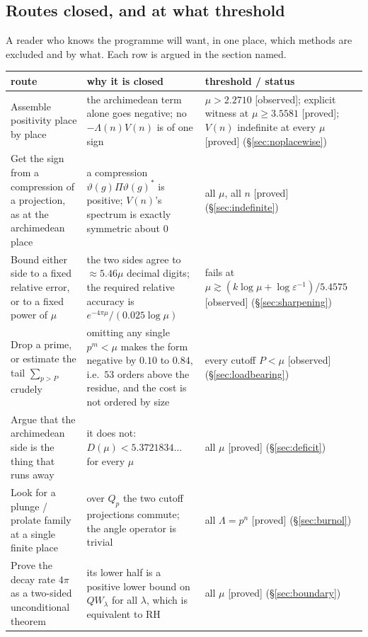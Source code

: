 \documentclass[11pt,a4paper]{article}
\theoremstyle{plain}
\theoremstyle{definition}
\theoremstyle{remark}
\newcommand{\st}[1]{{\normalfont\sffamily\footnotesize[#1]}}
\newcommand{\proved}{\st{proved}}
\newcommand{\observed}{\st{observed}}
\newcommand{\R}{\mathbb{R}}
\newcommand{\Z}{\mathbb{Z}}
\newcommand{\Q}{\mathbb{Q}}
\newcommand{\A}{\mathbb{A}}
\newcommand{\E}{\mathcal{E}}
\newcommand{\F}{\mathcal{F}}
\newcommand{\QW}{QW}
\def\QW{QW}\def\E{E}\def\F{F}\def\R{R}\def\Q{Q}\def\Z{Z}\def\A{A}%
\begin{document}
\subsection{Routes closed, and at what threshold}
\label{sec:closed}

A reader who knows the programme will want, in one place, which methods are
excluded and by what.  Each row is argued in the section named.

\begin{center}\small
\begin{tabular}{@{}p{}p{}p{}@{}}
\hline
route & why it is closed & threshold / status \\
\hline
Assemble positivity place by place
& the archimedean term alone goes negative; no $-\Lambda(n)V(n)$ is of one sign
& $\mu>2.2710$ \observed; explicit witness at $\mu\ge3.5581$ \proved{};
  $V(n)$ indefinite at every $\mu$ \proved{} (\S\ref{sec:noplacewise}) \\
Get the sign from a compression of a projection, as at the archimedean place
& a compression $\vartheta(g)\Pi\vartheta(g)^*$ is positive; $V(n)$'s spectrum is
exactly symmetric about $0$
& all $\mu$, all $n$ \proved{} (\S\ref{sec:indefinite}) \\
Bound either side to a fixed relative error, or to a fixed power of $\mu$
& the two sides agree to $\approx5.46\mu$ decimal digits; the required relative
accuracy is $e^{-4\pi\mu}/(0.025\log\mu)$
& fails at
  $\mu\gtrsim(k\log\mu+\log\varepsilon^{-1})/5.4575$ \observed{}
  (\S\ref{sec:sharpening}) \\
Drop a prime, or estimate the tail $\sum_{p>P}$ crudely
& omitting any single $p^m<\mu$ makes the form negative by $0.10$ to $0.84$, i.e.\
$53$ orders above the residue, and the cost is not ordered by size
& every cutoff $P<\mu$ \observed{} (\S\ref{sec:loadbearing}) \\
Argue that the archimedean side is the thing that runs away
& it does not: $D(\mu)<5.3721834\ldots$ for every $\mu$
& all $\mu$ \proved{} (\S\ref{sec:deficit}) \\
Look for a plunge / prolate family at a single finite place
& over $\Q_p$ the two cutoff projections commute; the angle operator is trivial
& all $\Lambda=p^n$ \proved{} (\S\ref{sec:burnol}) \\
Prove the decay rate $4\pi$ as a two-sided unconditional theorem
& its lower half is a positive lower bound on $\QW_\lambda$ for all $\lambda$,
which is equivalent to RH
& all $\mu$ \proved{} (\S\ref{sec:boundary}) \\

\end{tabular}
\end{center}
\end{document}
